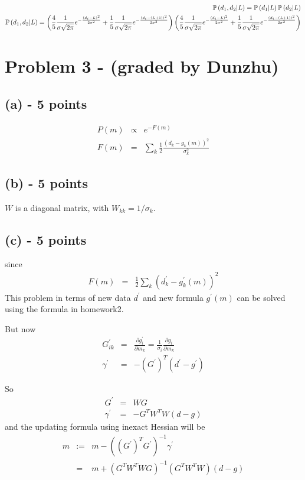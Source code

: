 \documentclass[11pt]{article}
\begin{document}
\begin{eqnarray*}
\mathbb{P}\left(d_1,d_2|L\right) = \mathbb{P}\left(d_1|L\right) \mathbb{P}\left(d_2|L\right) \\
\mathbb{P}\left(d_1,d_2|L\right) = \left(\frac{4}{5}\frac{1}{\sigma\sqrt{2\pi}} e^{-\frac{(d_i-L)^2}{2\sigma^2}} + \frac{1}{5}\frac{1}{\sigma\sqrt{2\pi}} e^{-\frac{(d_i-(L+1))^2}{2\sigma^2}}\right) \left(\frac{4}{5}\frac{1}{\sigma\sqrt{2\pi}} e^{-\frac{(d_i-L)^2}{2\sigma^2}} + \frac{1}{5}\frac{1}{\sigma\sqrt{2\pi}} e^{-\frac{(d_i-(L+1))^2}{2\sigma^2}}\right) 
\end{eqnarray*}




\section*{Problem 3 - (graded by Dunzhu)}
\subsection*{(a) - 5 points}
\begin{eqnarray*}
P(m) & \propto & e^{-F(m)} \\
F(m) & = & \sum_k \frac{1}{2}\frac{(d_k - g_k(m))^2}{\sigma_k^2}
\end{eqnarray*}



\subsection*{(b) - 5 points}
$W$ is a diagonal matrix, with $W_{kk}=1/\sigma_k$.

\subsection*{(c) - 5 points}
since 
\begin{eqnarray*}
F(m) & = & \frac{1}{2} \sum_k (d_k^{'} - g_k^{'}(m))^2
\end{eqnarray*}
This problem in terms of new data $d^{'}$ and new formula $g^{'}(m)$ can be solved using the formula in homework2.  

But now
\begin{eqnarray*}
G_{ik}^{'} & = & \frac{\partial g^{'}_i}{\partial m_k} =  \frac{1}{\sigma_i} \frac{\partial g_i}{\partial m_k}  \\
\gamma^{'} & = &  -(G^{'})^T (d^{'}-g^{'})
\end{eqnarray*}

So
\begin{eqnarray*}
G^{'} & = & WG \\
\gamma^{'} &= &  -G^TW^TW(d-g)
\end{eqnarray*}
and the updating formula using inexact Hessian will be
\begin{eqnarray*}
m & := & m - ((G^{'})^T G^{'})^{-1} \gamma^{'} \\
  & = & m + (G^T W^T W G)^{-1} (G^T W^T W) (d-g)
\end{eqnarray*}
\end{document}
